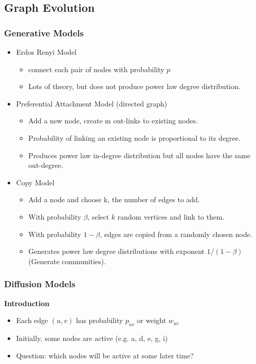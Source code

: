 \documentclass[../notes.tex]{subfiles}
\begin{document}
\subsection{Graph Evolution}
\subsubsection{Generative Models}
\begin{itemize}
  \item Erdos Renyi Model
  \begin{itemize}
    \item connect each pair of nodes with probability $p$
    \item Lots of theory, but does not produce power law degree distribution.
  \end{itemize}

  \item Preferential Attachment Model (directed graph)
  \begin{itemize}
    \item Add a new node, create m out-links to existing nodes.
    \item Probability of linking an existing node is proportional to its degree.
    \item Produces power law in-degree distribution but all nodes have the same out-degree.
  \end{itemize}

  \item Copy Model
  \begin{itemize}
    \item Add a node and choose k, the number of edges to add.
    \item With probability $\beta$, select $k$ random vertices and link to them.
    \item With probability $1-\beta$, edges are copied from a randomly chosen node.
    \item Generates power law degree distributions with exponent $1/(1- \beta)$ (Generate communities).
  \end{itemize}
\end{itemize}

\subsubsection{Diffusion Models}
\textbf{Introduction}
\begin{itemize}
  \item Each edge $(u,v)$ has probability $p_{uv}$ or weight $w_{uv}$
  \item Initially, some nodes are active (e.g. a, d, e, g, i)
  \item Question: which nodes will be active at some later time?
\end{itemize}
\end{document}
